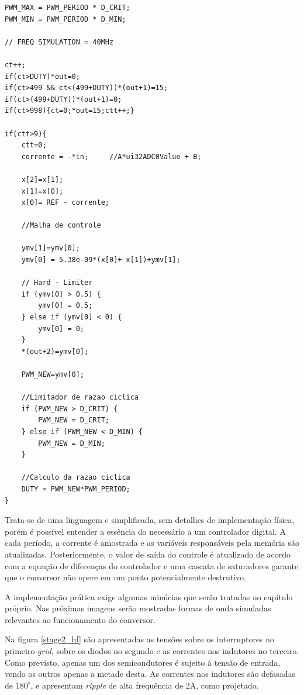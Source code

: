 \documentclass[
        12pt,
        openany, %
        oneside, %
        a4paper,			
        english,			
        brazil
        ]{abntbibufjf}
\begin{document}
\begin{lstlisting}
PWM_MAX = PWM_PERIOD * D_CRIT;
PWM_MIN = PWM_PERIOD * D_MIN;

// FREQ SIMULATION = 40MHz

ct++;
if(ct>DUTY)*out=0;
if(ct>499 && ct<(499+DUTY))*(out+1)=15;
if(ct>(499+DUTY))*(out+1)=0;
if(ct>998){ct=0;*out=15;ctt++;}

if(ctt>9){
    ctt=0;
    corrente = -*in;     //A*ui32ADC0Value + B;

    x[2]=x[1];
    x[1]=x[0];
    x[0]= REF - corrente;

    //Malha de controle

    ymv[1]=ymv[0];
    ymv[0] = 5.38e-09*(x[0]+ x[1])+ymv[1];

    // Hard - Limiter
    if (ymv[0] > 0.5) {
        ymv[0] = 0.5;
    } else if (ymv[0] < 0) {
        ymv[0] = 0;
    }
    *(out+2)=ymv[0];

    PWM_NEW=ymv[0];

    //Limitador de razao ciclica
    if (PWM_NEW > D_CRIT) {
        PWM_NEW = D_CRIT;
    } else if (PWM_NEW < D_MIN) {
        PWM_NEW = D_MIN;
    }

    //Calculo da razao ciclica
    DUTY = PWM_NEW*PWM_PERIOD;
}
\end{lstlisting}

Trata-se de uma linguagem c simplificada, sem detalhes de implementação física, porém é possível entender a essência do necessário a um controlador digital. A cada período, a corrente é amostrada e as variáveis responsáveis pela memória são atualizadas. Posteriormente, o valor de saída do controle é atualizado de acordo com a equação de diferenças do controlador e uma cascata de saturadores garante que o conversor não opere em um ponto potencialmente destrutivo.

A implementação prática exige algumas minúcias que serão tratadas no capítulo próprio. Nas próximas imagens serão mostradas formas de onda simuladas relevantes ao funcionamento do conversor.

Na figura \ref{stage2_hf} são apresentadas as tensões sobre os interruptores no primeiro \textit{grid}, sobre os diodos no segundo e as correntes nos indutores no terceiro. Como previsto, apenas um dos semicondutores é sujeito à tensão de entrada, vendo os outros apenas a metade desta. As correntes nos indutores são defasadas de $180^\circ$, e apresentam \textit{ripple} de alta frequência de 2A, como projetado.
\end{document}
